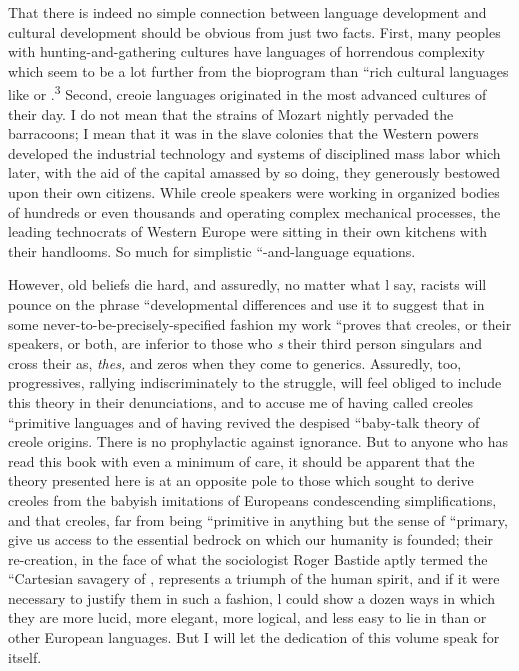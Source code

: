 That there is indeed no simple connection between language development and cultural development should be obvious from just two facts. First, many peoples with hunting-and-gathering cultures have languages of horrendous complexity which seem to be a lot further from the bioprogram than ``rich cultural languages like  or .\textsuperscript{3} Second, creoie languages originated in the most advanced cultures of their day. I do not mean that the strains of Mozart nightly pervaded the barracoons; I mean that it was in the slave colonies that the Western powers developed the industrial technology and systems of disciplined mass labor which later, with the aid of the
capital amassed by so doing, they generously bestowed upon their own citizens. While creole speakers were working in organized bodies of hundreds or even thousands and operating complex mechanical processes, the leading technocrats of Western Europe were sitting in their own kitchens with their handlooms. So much for simplistic ``-and-language equations.


However, old beliefs die hard, and assuredly, no matter what l say, racists will pounce on the phrase ``developmental differences and use it to suggest that in some never-to-be-precisely-specified fashion my work ``proves that creoles, or their speakers, or both, are inferior to those who \textit{s} their third person singulars and cross their as, \textit{thes,} and zeros when they come to generics. Assuredly, too, progressives, rallying indiscriminately to the struggle, will feel obliged to include this theory in their denunciations, and to accuse me of having called creoles ``primi\-tive languages and of having revived the despised ``baby-talk theory of creole origins. There is no prophylactic against ignorance. But to anyone who has read this book with even a minimum of care, it should
be apparent that the theory presented here is at an opposite pole to those which sought to derive creoles from the babyish imitations of Europeans condescending simplifications, and that creoles, far from being ``primitive in anything but the sense of ``primary, give us access to the essential bedrock on which our humanity is founded; their re-creation, in the face of what the  sociologist Roger Bastide aptly termed the ``Cartesian savagery of , repre\-sents a triumph of the human spirit, and if it were necessary to justify them in such a fashion, l could show a dozen ways in which they are more lucid, more elegant, more logical, and less easy to lie in than  or other European languages. But I will let the dedication of this volume speak for itself.

